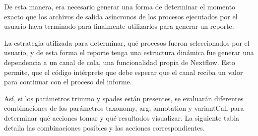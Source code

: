\documentclass[12pt]{article}
\begin{document}
De esta manera, era necesario generar una forma de determinar el 
momento exacto que los archivos de salida asíncronos de los procesos 
ejecutados por el usuario haya terminado para finalmente utilizarlos para 
generar un reporte.

La estrategia utilizada para determinar, qué procesos fueron 
seleccionados por el usuario, y de esta forma el reporte tenga 
una estructura dinámica fue generar una dependencia a un canal de 
cola, una funcionalidad propia de Nextflow. Esto permite, que el 
código intérprete que debe esperar que el canal reciba un valor para 
continuar con el proceso del informe.

Así, si los parámetros trimmo y spades están presentes, se evaluarán 
diferentes combinaciones de los parámetros taxonomy, arg, annotation y 
variantCall para determinar qué acciones tomar y qué resultados visualizar.
La siguiente tabla detalla las combinaciones posibles y las acciones 
correspondientes. 
\end{document}
